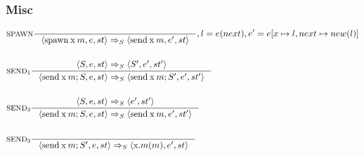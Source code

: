 \subsubsection{Misc}
\newcommand{\Tspawn}{\mathbin{\text{spawn}}}
\newcommand{\Tsend}{\mathbin{\text{send}}}
\begin{align*}
&\inference[$\text{SPAWN}$]{}
                       {\Braket{\Tspawn \Tx m,e,st} \Rightarrow_S \Braket{\Tsend \Tx m,e',st}}
												{, l = e(next), e' = e[x\mapsto l, next\mapsto new(l)]}
\\\\
&\inference[$\text{SEND}_1$]{\Braket{S,e,st} \Rightarrow_S \Braket{S',e',st'}}
                       {\Braket{\Tsend \Tx m ; S,e,st} \Rightarrow_S \Braket{\Tsend \Tx m;S',e',st'}}
\\\\
&\inference[$\text{SEND}_2$]{\Braket{S,e,st} \Rightarrow_S \Braket{e',st'}}
                       {\Braket{\Tsend \Tx m;S,e,st} \Rightarrow_S \Braket{\Tsend \Tx m,e',st'}}
\\\\
&\inference[$\text{SEND}_3$]{}
                       {\Braket{\Tsend \Tx m ; S',e,st} \Rightarrow_S \Braket{\Tx.m(m),e',st}}
\end{align*}